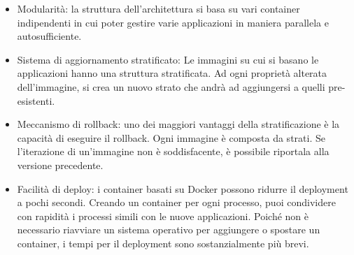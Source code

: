 \begin{itemize}
    \item Modularità: la struttura dell'architettura si basa su vari container indipendenti in cui poter gestire varie applicazioni in maniera parallela e autosufficiente.
    \item Sistema di aggiornamento stratificato: Le immagini su cui si basano le applicazioni hanno una struttura stratificata. Ad ogni proprietà alterata dell'immagine, si crea un nuovo strato che andrà ad aggiungersi a quelli pre-esistenti.
    \item Meccanismo di rollback: uno dei maggiori vantaggi della stratificazione è la capacità di eseguire il rollback. Ogni immagine è composta da strati. Se l'iterazione di un'immagine non è soddisfacente, è possibile riportala alla versione precedente.
    \item Facilità di deploy: i container basati su Docker possono ridurre il deployment a pochi secondi. Creando un container per ogni processo, puoi condividere con rapidità i processi simili con le nuove applicazioni. Poiché non è necessario riavviare un sistema operativo per aggiungere o spostare un container, i tempi per il deployment sono sostanzialmente più brevi.
\end{itemize}

\newpage
